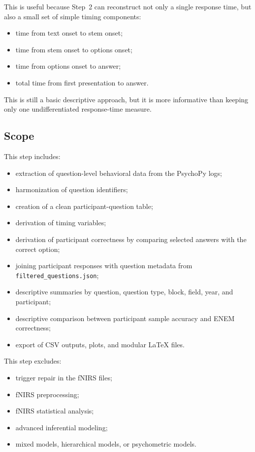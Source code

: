 This is useful because Step~2 can reconstruct not only a single response time, but also a small set of simple timing components:
\begin{itemize}
    \item time from text onset to stem onset;
    \item time from stem onset to options onset;
    \item time from options onset to answer;
    \item total time from first presentation to answer.
\end{itemize}

This is still a basic descriptive approach, but it is more informative than keeping only one undifferentiated response-time measure.

\subsection{Scope}
This step includes:
\begin{itemize}
    \item extraction of question-level behavioral data from the PsychoPy logs;
    \item harmonization of question identifiers;
    \item creation of a clean participant-question table;
    \item derivation of timing variables;
    \item derivation of participant correctness by comparing selected answers with the correct option;
    \item joining participant responses with question metadata from \texttt{filtered\_questions.json};
    \item descriptive summaries by question, question type, block, field, year, and participant;
    \item descriptive comparison between participant sample accuracy and ENEM correctness;
    \item export of CSV outputs, plots, and modular \LaTeX{} files.
\end{itemize}

This step excludes:
\begin{itemize}
    \item trigger repair in the fNIRS files;
    \item fNIRS preprocessing;
    \item fNIRS statistical analysis;
    \item advanced inferential modeling;
    \item mixed models, hierarchical models, or psychometric models.
\end{itemize}

